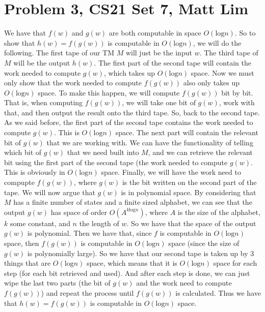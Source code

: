 \documentclass{article}
\begin{document}
\section*{Problem 3, CS21 Set 7, Matt Lim}
We have that $f(w)$ and $g(w)$ are both computable in space $O(\text{log}n)$.
So to show that $h(w) = f(g(w))$ is computable in $O(\text{log}n)$, we will do
the following. The first tape of our TM $M$ will just be the input $w$. The
third tape of $M$ will be the output $h(w)$. The first part of the second tape
will contain the work needed to compute $g(w)$, which takes up $O(\text{log}n)$
space. Now we must only show that the work needed to compute $f(g(w))$ also
only takes up $O(\text{log}n)$ space. To make this happen, we will compute
$f(g(w))$ bit by bit. That is, when computing $f(g(w))$, we will take one bit
of $g(w)$, work with that, and then output the result onto the third tape. So,
back to the second tape. As we said before, the first part of the second tape
contains the work needed to compute $g(w)$. This is $O(\text{log}n)$ space. The
next part will contain the relevant bit of $g(w)$ that we are working with. We
can have the functionality of telling which bit of $g(w)$ that we need built
into $M$, and we can retrieve the relevant bit using the first part of the
second tape (the work needed to compute $g(w)$.
This is obviously in $O(\text{log}n)$ space. Finally, we will have
the work need to compupte $f(g(w))$, where $g(w)$ is the bit written on the
second part of the tape.
We will now argue that $g(w)$ is in polynomial space. By considering that
$M$ has a finite number of states and a finite sized alphabet, we can see
that the output $g(w)$ has space of order $O(A^{k\text{log}n})$, where $A$ is
the size of the alphabet, $k$ some constant, and $n$ the length of $w$. So
we have that the space of the output $g(w)$ is polynomial. Then we have that,
since $f$ is computable in $O(\text{log}n)$ space, then $f(g(w))$ is computable
in $O(\text{log}n)$ space (since the size of $g(w)$ is polynomially large).
So we have that our second tape is taken up by
3 things that are $O(\text{log}n)$ space, which means that it is
$O(\text{log}n)$ space for each step (for each bit retrieved and used). And
after each step is done, we can just
wipe the last two parts (the bit of $g(w)$ and the work need to compute $f(g(w))$)
and repeat the process until $f(g(w))$ is calculated. Thus we have that
$h(w) = f(g(w))$ is computable in $O(\text{log}n)$ space.
\newpage

\end{document}
